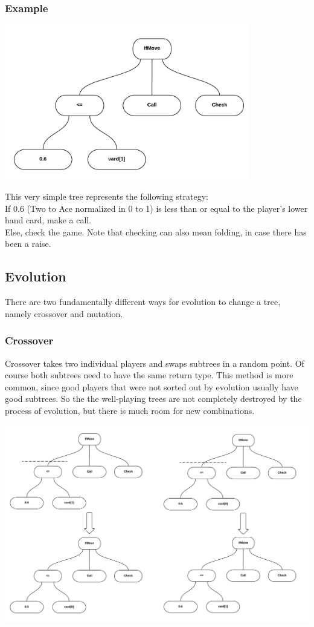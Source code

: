 \documentclass[12pt,fleqn,a4paper]{article}
\begin{document}
\subsubsection{Example}
\begin{center}
	\includegraphics[width=0.8\textwidth]{tree1.png}
\end{center}
This very simple tree represents the following strategy:
~\\
If 0.6 (Two to Ace normalized in 0 to 1) is less than or equal to the player's lower hand card, make a call.\\
Else, check the game. Note that checking can also mean folding, in case there has been a raise.

\subsection{Evolution}
There are two fundamentally different ways for evolution to change a tree, namely crossover and mutation.

\subsubsection{Crossover}
Crossover takes two individual players and swaps subtrees in a random point.
Of course both subtrees need to have the same return type.
This method is more common, since good players that were not sorted out by evolution usually have good subtrees.
So the the well-playing trees are not completely destroyed by the process of evolution, but there is much room for new combinations.

\begin{center}
	\includegraphics[width=1.0\textwidth]{tree_crossover.png}
\end{center}
\end{document}

